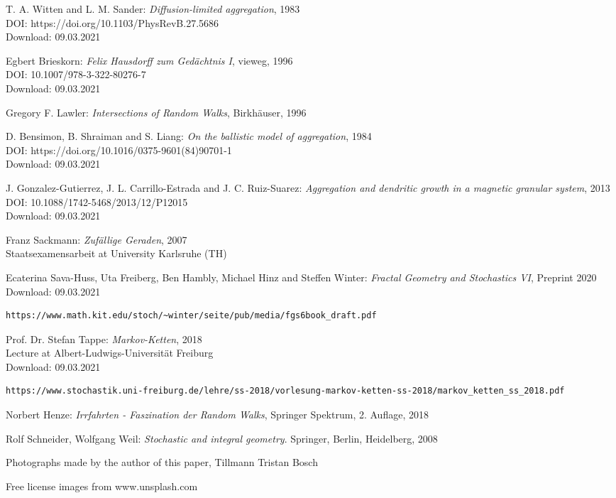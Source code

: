 \documentclass[12pt,a4paper]{scrartcl}
\newcommand{\1}{\mathbbm{1}}
\theoremstyle{definition}
\numberwithin{equation}{section}
\begin{document}
\begin{thebibliography}{biblio}
\thispagestyle{empty}

T. A. Witten and L. M. Sander: \emph{Diffusion-limited aggregation}, 1983\\
DOI: https://doi.org/10.1103/PhysRevB.27.5686\\
Download: 09.03.2021

Egbert Brieskorn: \emph{Felix Hausdorff zum Gedächtnis I}, vieweg, 1996\\
DOI: 10.1007/978-3-322-80276-7\\
Download: 09.03.2021

Gregory F. Lawler: \emph{Intersections of Random Walks}, Birkhäuser, 1996

D. Bensimon, B. Shraiman and S. Liang: \emph{On the ballistic model of aggregation}, 1984\\
DOI: https://doi.org/10.1016/0375-9601(84)90701-1\\
Download: 09.03.2021

J. Gonzalez-Gutierrez, J. L. Carrillo-Estrada and J. C. Ruiz-Suarez: \emph{Aggregation and dendritic growth in a magnetic granular system}, 2013\\
DOI: 10.1088/1742-5468/2013/12/P12015\\
Download: 09.03.2021

Franz Sackmann: \emph{Zufällige Geraden}, 2007\\
Staatsexamensarbeit at University Karlsruhe (TH)

Ecaterina Sava-Huss, Uta Freiberg, Ben Hambly, Michael Hinz and Steffen Winter: \emph{Fractal Geometry and Stochastics VI}, Preprint 2020\\
Download: 09.03.2021
\begin{Verbatim}[fontsize=\small]
https://www.math.kit.edu/stoch/~winter/seite/pub/media/fgs6book_draft.pdf
\end{Verbatim}

Prof. Dr. Stefan Tappe: \emph{Markov-Ketten}, 2018\\
Lecture at Albert-Ludwigs-Universität Freiburg\\
Download: 09.03.2021
\begin{Verbatim}[fontsize=\tiny]
https://www.stochastik.uni-freiburg.de/lehre/ss-2018/vorlesung-markov-ketten-ss-2018/markov_ketten_ss_2018.pdf
\end{Verbatim}

Norbert Henze: \emph{Irrfahrten - Faszination der Random Walks}, Springer Spektrum, 2. Auflage, 2018

Rolf Schneider, Wolfgang Weil: \emph{Stochastic and integral geometry}. Springer, Berlin, Heidelberg, 2008

Photographs made by the author of this paper, Tillmann Tristan Bosch

Free license images from www.unsplash.com

\end{thebibliography}
\end{document}

